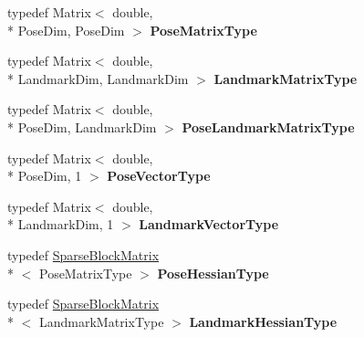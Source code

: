 \begin{DoxyCompactItemize}
\item 
\hypertarget{structg2o_1_1BlockSolverTraits_a35e6e4bad138dcfcaa3b1339e168bf30}{typedef Matrix$<$ double, \\*
Pose\-Dim, Pose\-Dim $>$ {\bfseries Pose\-Matrix\-Type}}\label{structg2o_1_1BlockSolverTraits_a35e6e4bad138dcfcaa3b1339e168bf30}

\item 
\hypertarget{structg2o_1_1BlockSolverTraits_add9b9fbfef352b7654d41914d5eaa58c}{typedef Matrix$<$ double, \\*
Landmark\-Dim, Landmark\-Dim $>$ {\bfseries Landmark\-Matrix\-Type}}\label{structg2o_1_1BlockSolverTraits_add9b9fbfef352b7654d41914d5eaa58c}

\item 
\hypertarget{structg2o_1_1BlockSolverTraits_a91e6510ad42179701d22c3ac312237cd}{typedef Matrix$<$ double, \\*
Pose\-Dim, Landmark\-Dim $>$ {\bfseries Pose\-Landmark\-Matrix\-Type}}\label{structg2o_1_1BlockSolverTraits_a91e6510ad42179701d22c3ac312237cd}

\item 
\hypertarget{structg2o_1_1BlockSolverTraits_a032ed57e9bc44c36093f97b32e1506f6}{typedef Matrix$<$ double, \\*
Pose\-Dim, 1 $>$ {\bfseries Pose\-Vector\-Type}}\label{structg2o_1_1BlockSolverTraits_a032ed57e9bc44c36093f97b32e1506f6}

\item 
\hypertarget{structg2o_1_1BlockSolverTraits_af5154a15abb566ff5bffc0adb9f0458d}{typedef Matrix$<$ double, \\*
Landmark\-Dim, 1 $>$ {\bfseries Landmark\-Vector\-Type}}\label{structg2o_1_1BlockSolverTraits_af5154a15abb566ff5bffc0adb9f0458d}

\item 
\hypertarget{structg2o_1_1BlockSolverTraits_a03351362339d8e6609c577123350bb2a}{typedef \hyperlink{classg2o_1_1SparseBlockMatrix}{Sparse\-Block\-Matrix}\\*
$<$ Pose\-Matrix\-Type $>$ {\bfseries Pose\-Hessian\-Type}}\label{structg2o_1_1BlockSolverTraits_a03351362339d8e6609c577123350bb2a}

\item 
\hypertarget{structg2o_1_1BlockSolverTraits_ae761bb32d5267e4d74e5d9c2c7e7ad2f}{typedef \hyperlink{classg2o_1_1SparseBlockMatrix}{Sparse\-Block\-Matrix}\\*
$<$ Landmark\-Matrix\-Type $>$ {\bfseries Landmark\-Hessian\-Type}}\label{structg2o_1_1BlockSolverTraits_ae761bb32d5267e4d74e5d9c2c7e7ad2f}


\end{DoxyCompactItemize}
